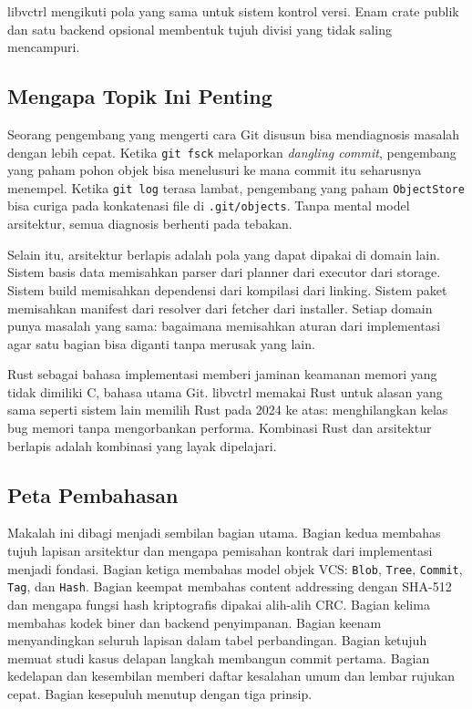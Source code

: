 \documentclass[11pt,a4paper]{article}
\begin{document}
libvctrl mengikuti pola yang sama untuk sistem kontrol versi. Enam crate publik dan satu backend opsional membentuk tujuh divisi yang tidak saling mencampuri.

\subsection{Mengapa Topik Ini Penting}

Seorang pengembang yang mengerti cara Git disusun bisa mendiagnosis masalah dengan lebih cepat. Ketika \texttt{git fsck} melaporkan \textit{dangling commit}, pengembang yang paham pohon objek bisa menelusuri ke mana commit itu seharusnya menempel. Ketika \texttt{git log} terasa lambat, pengembang yang paham \texttt{ObjectStore} bisa curiga pada konkatenasi file di \texttt{.git/objects}. Tanpa mental model arsitektur, semua diagnosis berhenti pada tebakan.

Selain itu, arsitektur berlapis adalah pola yang dapat dipakai di domain lain. Sistem basis data memisahkan parser dari planner dari executor dari storage. Sistem build memisahkan dependensi dari kompilasi dari linking. Sistem paket memisahkan manifest dari resolver dari fetcher dari installer. Setiap domain punya masalah yang sama: bagaimana memisahkan aturan dari implementasi agar satu bagian bisa diganti tanpa merusak yang lain.

Rust sebagai bahasa implementasi memberi jaminan keamanan memori yang tidak dimiliki C, bahasa utama Git. libvctrl memakai Rust untuk alasan yang sama seperti sistem lain memilih Rust pada 2024 ke atas: menghilangkan kelas bug memori tanpa mengorbankan performa. Kombinasi Rust dan arsitektur berlapis adalah kombinasi yang layak dipelajari.

\subsection{Peta Pembahasan}

Makalah ini dibagi menjadi sembilan bagian utama. Bagian kedua membahas tujuh lapisan arsitektur dan mengapa pemisahan kontrak dari implementasi menjadi fondasi. Bagian ketiga membahas model objek VCS: \texttt{Blob}, \texttt{Tree}, \texttt{Commit}, \texttt{Tag}, dan \texttt{Hash}. Bagian keempat membahas content addressing dengan SHA-512 dan mengapa fungsi hash kriptografis dipakai alih-alih CRC. Bagian kelima membahas kodek biner dan backend penyimpanan. Bagian keenam menyandingkan seluruh lapisan dalam tabel perbandingan. Bagian ketujuh memuat studi kasus delapan langkah membangun commit pertama. Bagian kedelapan dan kesembilan memberi daftar kesalahan umum dan lembar rujukan cepat. Bagian kesepuluh menutup dengan tiga prinsip.
\end{document}

